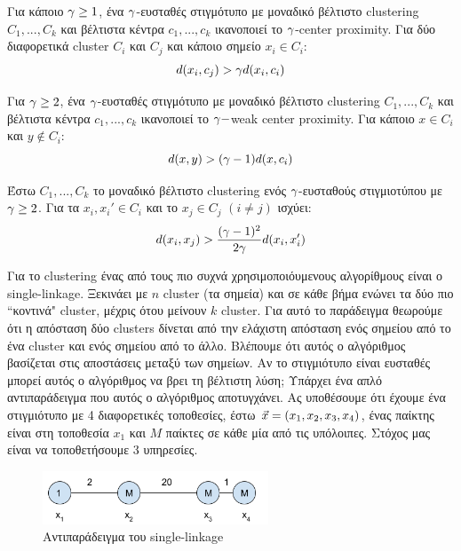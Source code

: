 \begin{definitiongr}
Για κάποιο $\gamma \ge 1$, ένα $\gamma$-ευσταθές στιγμότυπο με μοναδικό βέλτιστο clustering $C_1, . . . , C_k$ και βέλτιστα κέντρα $c_1, . . . , c_k$ ικανοποιεί το $\gamma$-center proximity. Για δύο διαφορετικά cluster $C_i$ και $C_j$ και κάποιο σημείο $x_i\in C_i$: 
\[d(x_i,c_j)>\gamma d(x_i,c_i) \]
\end{definitiongr}

\begin{lemmagr}
Για $\gamma \ge 2$, ένα $\gamma$-ευσταθές στιγμότυπο με μοναδικό βέλτιστο clustering $C_1, . . . , C_k$ και βέλτιστα κέντρα $c_1, . . . , c_k$ ικανοποιεί το $\gamma-$weak center proximity. Για κάποιο $x\in C_i$ και $y \notin C_i$:
\[d(x,y)>(\gamma -1) d(x,c_i) \]
\end{lemmagr}

\begin{lemmagr}

Έστω $C_1, . . . , C_k$ το μοναδικό βέλτιστο clustering ενός $\gamma$-ευσταθούς στιγμιοτύπου με  $\gamma\ge2$. Για  τα $x_i,x_i'\in C_i$ και το $x_j \in C_j$ $(i\ne j)$ ισχύει:
\[ d(x_i,x_j) > \frac{(\gamma-1)^2}{2\gamma} d(x_i,x_i') \]
\end{lemmagr} 

Για το clustering ένας από τους πιο συχνά χρησιμοποιόυμενους αλγορίθμους είναι ο single-linkage. Ξεκινάει με $n$ cluster (τα σημεία) και σε κάθε βήμα ενώνει τα δύο πιο ``κοντινά" cluster, μέχρις ότου μείνουν $k$ cluster. Για αυτό το παράδειγμα θεωρούμε ότι η απόσταση δύο clusters δίνεται από την ελάχιστη απόσταση ενός σημείου από το ένα cluster και ενός σημείου από το άλλο. Βλέπουμε ότι αυτός ο αλγόριθμος βασίζεται στις αποστάσεις μεταξύ των σημείων. Αν το στιγμιότυπο είναι ευσταθές μπορεί αυτός ο αλγόριθμος να βρει τη βέλτιστη λύση; Υπάρχει ένα απλό αντιπαράδειγμα που αυτός ο αλγόριθμος αποτυγχάνει. Ας υποθέσουμε ότι έχουμε ένα στιγμιότυπο με 4 διαφορετικές τοποθεσίες, έστω $\vec{x}=(x_1,x_2,x_3,x_4)$, ένας παίκτης είναι στη τοποθεσία $x_1$ και $M$ παίκτες σε κάθε μία από τις υπόλοιπες. Στόχος μας είναι να τοποθετήσουμε 3 υπηρεσίες.   
\begin{figure}[ht]
    \centering
    \includegraphics[width=0.6\textwidth]{Images/SingleLinkageC.png}
    \caption{Αντιπαράδειγμα του single-linkage}
    \label{fig:singleGR}
\end{figure}

